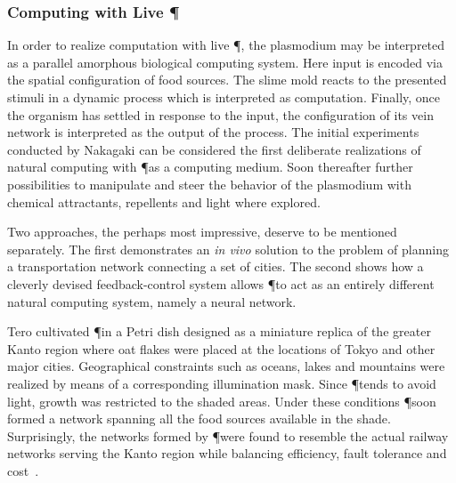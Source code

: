 			\FloatBarrier

		\subsubsection{Computing with Live \P}

			In order to realize computation with live \P, the plasmodium may be interpreted as a parallel amorphous biological computing system. Here input is encoded via the spatial configuration of food sources. The slime mold reacts to the presented stimuli in a dynamic process which is interpreted as computation. Finally, once the organism has settled in response to the input, the configuration of its vein network is interpreted as the output of the process. The initial experiments conducted by Nakagaki \etal can be considered the first deliberate realizations of natural computing with \P as a computing medium. Soon thereafter further possibilities to manipulate and steer the behavior of the plasmodium with chemical attractants, repellents and light where explored.  

			Two approaches, the perhaps most impressive, deserve to be mentioned separately. The first demonstrates an \textit{in vivo} solution to the problem of planning a transportation network connecting a set of cities. The second shows how a cleverly devised feedback-control system allows \P to act as an entirely different natural computing system, namely a neural network.

			Tero \etal cultivated \P in a Petri dish designed as a miniature replica of the greater Kanto region where oat flakes were placed at the locations of Tokyo and other major cities. Geographical constraints such as oceans, lakes and mountains were realized by means of a corresponding illumination mask. Since \P tends to avoid light, growth was restricted to the shaded areas. Under these conditions \P soon formed a network spanning all the food sources available in the shade. Surprisingly, the networks formed by \P were found to resemble the actual railway networks serving the Kanto region while balancing efficiency, fault tolerance and cost~\cite{Tero439}. 

